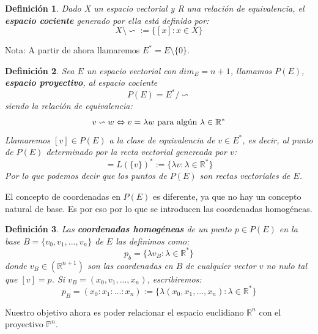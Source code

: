\documentclass[a4paper,11pt, oneside]{book}
\newtheorem{defi}{Definición}
\begin{document}
\begin{defi}
	Dado X un espacio vectorial y R una relación de equivalencia, el \textbf{espacio cociente} generado por ella está definido por:
	\begin{equation}
		X \setminus \backsim := \{[x]: x \in X\}
	\end{equation}
\end{defi}



Nota: A partir de ahora llamaremos $E^* = E \setminus \{0\}$.
\begin{defi}
	Sea $E$ un espacio vectorial con $dim_E=n+1$, llamamos $P(E)$, \textbf{espacio proyectivo}, al espacio cociente
	\begin{equation}
		P(E) = E^* / \backsim
	\end{equation}
	siendo la relación de equivalencia:
	\begin{equation}
		v \backsim w \Leftrightarrow v = \lambda w \textup{ para algún } \lambda \in \mathbb R^* 
	\end{equation}
	Llamaremos $[v] \in P(E)$ a la clase de equivalencia de $v \in E^*$, es decir, al punto de $P(E)$ determinado por la recta vectorial genereada por $v$:
	\begin{equation}
		[v] = L(\{v\})^* := \{\lambda v: \lambda \in \mathbb R^*\}
	\end{equation}
	Por lo que podemos decir que los puntos de $P(E)$ son rectas vectoriales de $E$.
\end{defi}

El concepto de coordenadas en $P(E)$ es diferente, ya que no hay un concepto natural de base. Es por eso por lo que se introducen las coordenadas homogéneas.
\begin{defi}
	Las \textbf{coordenadas homogéneas} de un punto $p \in P(E)$ en la base $B = \{v_0,v_1,...,v_n\}$ de $E$ las definimos como:
	\begin{equation}
		p_b = \{\lambda v_B: \lambda \in \mathbb R^*\}
	\end{equation}
	donde $v_B \in (\mathbb R^{n+1})$ son las coordenadas en $B$ de cualquier vector $v$ no nulo tal que $[v] = p$. Si $v_B = (x_0,v_1,...,x_n)$, escribiremos:
	\begin{equation}
		p_B = (x_0:x_1:...:x_n) := \{\lambda(x_0,x_1,...,x_n): \lambda \in \mathbb R^*\}
	\end{equation}
\end{defi}

Nuestro objetivo ahora es poder relacionar el espacio euclidiano $\mathbb R^n$ con el proyectivo $\mathbb P^n$. 
\end{document}
